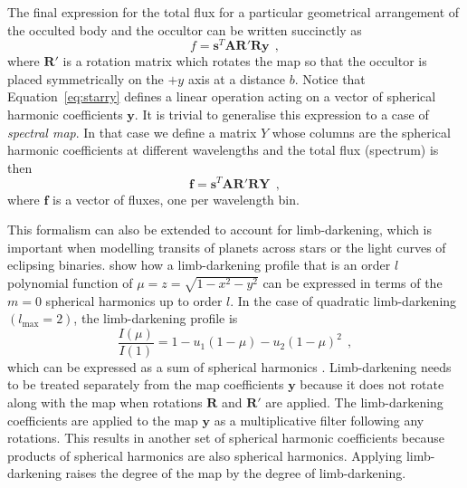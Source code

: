 \documentclass[12pt,dvipsnames]{report}
\newcommand{\hquad}{~~}
\begin{document}
The final expression for the total flux for a particular geometrical
arrangement of the occulted body and the occultor can be written
succinctly as
\begin{equation}
    f = \mathbf{s}^T\mathbf{A}\mathbf{R}'\mathbf{R}\mathbf{y}
    \hquad,
    \label{eq:starry}
\end{equation}
where $\mathbf{R}'$ is a rotation matrix which rotates the map so that the occultor
is placed symmetrically on the $+y$ axis at a distance $b$.
Notice that Equation~\ref{eq:starry} defines a linear operation acting on a vector
of spherical harmonic coefficients $\mathbf{y}$.
It is trivial to generalise this expression to a case of \emph{spectral map}. In
that case we define a matrix $Y$ whose columns are the spherical harmonic coefficients
at different wavelengths and the total flux (spectrum) is then
\begin{equation}
    \mathbf{f} = \mathbf{s}^T\mathbf{A}\mathbf{R}'\mathbf{R}\mathbf{Y}
    \hquad,
    \label{eq:starry_mw}
\end{equation}
where $\mathbf{f}$ is a vector of fluxes, one per wavelength bin.

This formalism can also be extended to account for limb-darkening, which is
important when modelling transits of planets across stars or the light curves of
eclipsing binaries. \citet{2020AJ....159..123A} show how a limb-darkening
profile that is an order $l$ polynomial function of
$\mu=z=\sqrt{1-x^{2}-y^{2}}$ can be expressed in terms of the $m=0$ spherical
harmonics up to order $l$. In the case of quadratic limb-darkening
$(l_\mathrm{max}=2)$, the limb-darkening profile is
\begin{equation}
    \frac{I(\mu)}{I(1)}=1-u_{1}(1-\mu)-u_{2}(1-\mu)^{2}
    \hquad,
\end{equation}
which can be expressed as a sum of spherical harmonics
\citep[Equation 38 in][]{2019AJ....157...64L}. Limb-darkening needs to be
treated separately from the map coefficients $\mathbf{y}$ because it does not rotate along with the map
when rotations $\mathbf{R}$ and $\mathbf{R}'$ are applied. The limb-darkening
coefficients are applied to the map $\mathbf{y}$ as a multiplicative filter
following any rotations. This results in another set of spherical harmonic
coefficients because products of spherical harmonics are also spherical
harmonics. Applying limb-darkening raises the degree of the map by the degree
of limb-darkening.
\end{document}
